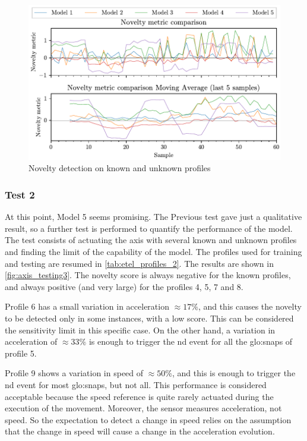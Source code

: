 \begin{figure}
    \centering
    \includegraphics{images/LinearMotor/Testing2.pdf}
    \caption{Novelty detection on known and unknown profiles}
    \label{fig:axis_testing2}
\end{figure}

\subsubsection{Test 2}
At this point, Model 5 seems promising. The Previous test gave just a qualitative result, so a further test is performed to quantify the performance of the model. The test consists of actuating the axis with several known and unknown profiles and finding the limit of the capability of the model. The profiles used for training and testing are resumed in \autoref{tab:etel_profiles_2}. The results are shown in \autoref{fig:axis_testing3}. The novelty score is always negative for the known profiles, and always positive (and very large) for the profiles 4, 5, 7 and 8. 

Profile 6 has a small variation in acceleration $\approx 17\%$, and this causes the novelty to be detected only in some instances, with a low score. This can be considered the sensitivity limit in this specific case. On the other hand, a variation in acceleration of $\approx 33\%$ is enough to trigger the \gls{nd} event for all the \gls{glo:snap}s of profile 5. 

Profile 9 shows a variation in speed of $\approx 50\%$, and this is enough to trigger the \gls{nd} event for most \gls{glo:snap}s, but not all. This performance is considered acceptable because the speed reference is quite rarely actuated during the execution of the movement. Moreover, the sensor measures acceleration, not speed. So the expectation to detect a change in speed relies on the assumption that the change in speed will cause a change in the acceleration evolution.

